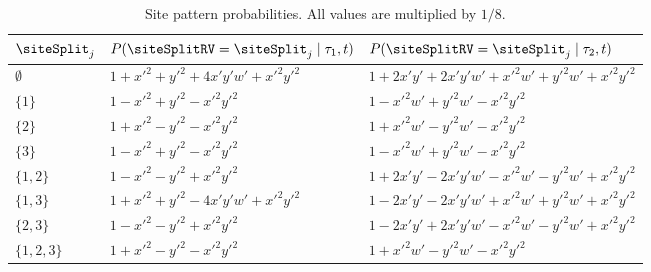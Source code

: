 \begin{table}
\centering
\begin{tabular}{|l|l|l|}
    \hline
$\siteSplit_j$   &$P(\siteSplitRV=\siteSplit_j \mid \tau_1,t)$&$P(\siteSplitRV=\siteSplit_j \mid \tau_2,t)$\\
    \hline
    $\emptyset$    &$1+x'^2+y'^2+4x'y'w'+x'^2y'^2$&$1+2x'y'+2x'y'w'+x'^2w'+y'^2w'+x'^2y'^2$\\
    $\{1\}$        &$1-x'^2+y'^2-x'^2y'^2$&$1-x'^2w'+y'^2w'-x'^2y'^2$\\
    $\{2\}$        &$1+x'^2-y'^2-x'^2y'^2$&$1+x'^2w'-y'^2w'-x'^2y'^2$\\
    $\{3\}$        &$1-x'^2+y'^2-x'^2y'^2$&$1-x'^2w'+y'^2w'-x'^2y'^2$\\
    $\{1,2\}$      &$1-x'^2-y'^2+x'^2y'^2$&$1+2x'y'-2x'y'w'-x'^2w'-y'^2w'+x'^2y'^2$\\
    $\{1,3\}$      &$1+x'^2+y'^2-4x'y'w'+x'^2y'^2$&$1-2x'y'-2x'y'w'+x'^2w'+y'^2w'+x'^2y'^2$\\
    $\{2,3\}$      &$1-x'^2-y'^2+x'^2y'^2$&$1-2x'y'+2x'y'w'-x'^2w'-y'^2w'+x'^2y'^2$\\
    $\{1,2,3\}$    &$1+x'^2-y'^2-x'^2y'^2$&$1+x'^2w'-y'^2w'-x'^2y'^2$\\
    \hline
\end{tabular}
\caption{Site pattern probabilities.
All values are multiplied by $1/8$.}
\label{tab:sitepatprob}
\end{table}

